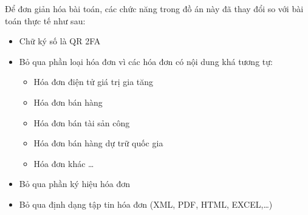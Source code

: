 Để đơn giản hóa bài toán, các chức năng trong đồ án này đã thay đổi so với bài toán thực tế như sau:

\begin{itemize}

    \item Chữ ký số là QR 2FA


    \item Bỏ qua phần  loại hóa đơn vì các hóa đơn có nội dung khá tương tự:

          \begin{itemize}

              \item Hóa đơn điện tử giá trị gia tăng

              \item Hóa đơn bán hàng

              \item Hóa đơn bán tài sản công

              \item Hóa đơn bán hàng dự trữ quốc gia

              \item Hóa đơn khác \dots

          \end{itemize}

    \item   Bỏ qua phần ký hiệu hóa đơn







    \item   Bỏ qua định dạng tập tin hóa đơn  (XML, PDF, HTML, EXCEL,\dots)

\end{itemize}